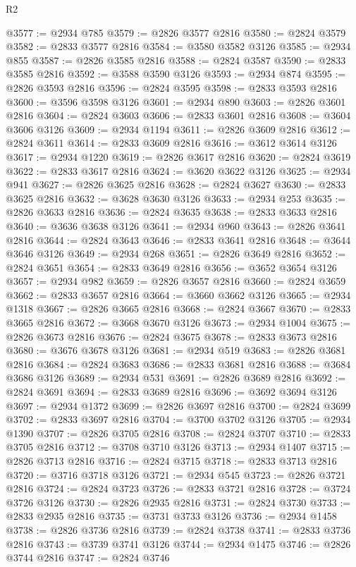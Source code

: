 \begin{lexlean}{R2}
\begin{coremodule}
@3577 := @2934 @785
@3579 := @2826 @3577 @2816
@3580 := @2824 @3579
@3582 := @2833 @3577 @2816
@3584 := @3580 @3582 @3126
@3585 := @2934 @855
@3587 := @2826 @3585 @2816
@3588 := @2824 @3587
@3590 := @2833 @3585 @2816
@3592 := @3588 @3590 @3126
@3593 := @2934 @874
@3595 := @2826 @3593 @2816
@3596 := @2824 @3595
@3598 := @2833 @3593 @2816
@3600 := @3596 @3598 @3126
@3601 := @2934 @890
@3603 := @2826 @3601 @2816
@3604 := @2824 @3603
@3606 := @2833 @3601 @2816
@3608 := @3604 @3606 @3126
@3609 := @2934 @1194
@3611 := @2826 @3609 @2816
@3612 := @2824 @3611
@3614 := @2833 @3609 @2816
@3616 := @3612 @3614 @3126
@3617 := @2934 @1220
@3619 := @2826 @3617 @2816
@3620 := @2824 @3619
@3622 := @2833 @3617 @2816
@3624 := @3620 @3622 @3126
@3625 := @2934 @941
@3627 := @2826 @3625 @2816
@3628 := @2824 @3627
@3630 := @2833 @3625 @2816
@3632 := @3628 @3630 @3126
@3633 := @2934 @253
@3635 := @2826 @3633 @2816
@3636 := @2824 @3635
@3638 := @2833 @3633 @2816
@3640 := @3636 @3638 @3126
@3641 := @2934 @960
@3643 := @2826 @3641 @2816
@3644 := @2824 @3643
@3646 := @2833 @3641 @2816
@3648 := @3644 @3646 @3126
@3649 := @2934 @268
@3651 := @2826 @3649 @2816
@3652 := @2824 @3651
@3654 := @2833 @3649 @2816
@3656 := @3652 @3654 @3126
@3657 := @2934 @982
@3659 := @2826 @3657 @2816
@3660 := @2824 @3659
@3662 := @2833 @3657 @2816
@3664 := @3660 @3662 @3126
@3665 := @2934 @1318
@3667 := @2826 @3665 @2816
@3668 := @2824 @3667
@3670 := @2833 @3665 @2816
@3672 := @3668 @3670 @3126
@3673 := @2934 @1004
@3675 := @2826 @3673 @2816
@3676 := @2824 @3675
@3678 := @2833 @3673 @2816
@3680 := @3676 @3678 @3126
@3681 := @2934 @519
@3683 := @2826 @3681 @2816
@3684 := @2824 @3683
@3686 := @2833 @3681 @2816
@3688 := @3684 @3686 @3126
@3689 := @2934 @531
@3691 := @2826 @3689 @2816
@3692 := @2824 @3691
@3694 := @2833 @3689 @2816
@3696 := @3692 @3694 @3126
@3697 := @2934 @1372
@3699 := @2826 @3697 @2816
@3700 := @2824 @3699
@3702 := @2833 @3697 @2816
@3704 := @3700 @3702 @3126
@3705 := @2934 @1390
@3707 := @2826 @3705 @2816
@3708 := @2824 @3707
@3710 := @2833 @3705 @2816
@3712 := @3708 @3710 @3126
@3713 := @2934 @1407
@3715 := @2826 @3713 @2816
@3716 := @2824 @3715
@3718 := @2833 @3713 @2816
@3720 := @3716 @3718 @3126
@3721 := @2934 @545
@3723 := @2826 @3721 @2816
@3724 := @2824 @3723
@3726 := @2833 @3721 @2816
@3728 := @3724 @3726 @3126
@3730 := @2826 @2935 @2816
@3731 := @2824 @3730
@3733 := @2833 @2935 @2816
@3735 := @3731 @3733 @3126
@3736 := @2934 @1458
@3738 := @2826 @3736 @2816
@3739 := @2824 @3738
@3741 := @2833 @3736 @2816
@3743 := @3739 @3741 @3126
@3744 := @2934 @1475
@3746 := @2826 @3744 @2816
@3747 := @2824 @3746

\end{coremodule}
\end{lexlean}

